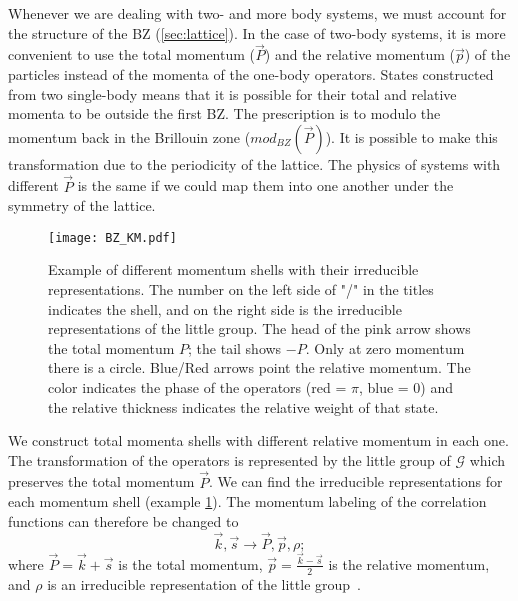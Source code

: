 Whenever we are dealing with two- and more body systems, we must account for the structure of the BZ (\cref{sec:lattice}). In the case of two-body systems, it is more convenient to use the total momentum ($\vec{P}$) and the relative momentum ($\vec{p}$) of the particles instead of the momenta of the one-body operators. States constructed from two single-body means that it is possible for their total and relative momenta to be outside the first BZ. The prescription is to modulo the momentum back in the Brillouin zone ($mod_{BZ}(\vec{P})$). It is possible to make this transformation due to the periodicity of the lattice. The physics of systems with different $\vec{P}$ is the same if we could map them into one another under the symmetry of the lattice. 
\begin{figure}[htbp]
    \centerline{\texttt{[image: BZ\_KM.pdf]}}
    \caption{Example of different momentum shells with their irreducible representations. The number on the left side of "/" in the titles indicates the shell, and on the right side is the irreducible representations of the little group. The head of the pink arrow shows the total momentum $P$; the tail shows $-P$. Only at zero momentum there is a circle. Blue/Red arrows point the relative momentum. The color indicates the phase of the operators (red = $\pi$, blue = 0) and the relative thickness indicates the relative weight of that state.}
    \label{fig:mom_shells}
\end{figure}
We construct total momenta shells with different relative momentum in each one. The transformation of the operators is represented by the little group of $\mathcal{G}$ which preserves the total momentum $\vec{P}$. We can find the irreducible representations for each momentum shell (example \cref{fig:mom_shells}). The momentum labeling of the correlation functions can therefore be changed to
\begin{equation}
  \vec{k},\vec{s} \longrightarrow \vec{P},\vec{p},\rho;
\end{equation}
where $\vec{P} = \vec{k}+\vec{s}$ is the total momentum, $\vec{p} = \frac{\vec{k}-\vec{s}}{2}$ is the relative momentum, and $\rho$ is an irreducible representation of the little group~\cite{evan}.